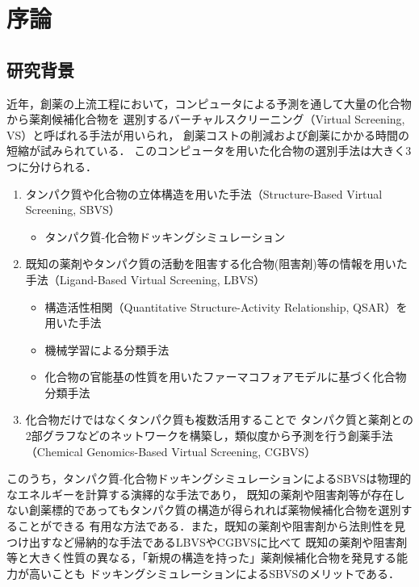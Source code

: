 \chapter{序論}
\section{研究背景}\label{sec:background}
近年，創薬の上流工程において，コンピュータによる予測を通して大量の化合物から薬剤候補化合物を
選別するバーチャルスクリーニング（Virtual Screening, VS）と呼ばれる手法が用いられ，
創薬コストの削減および創薬にかかる時間の短縮が試みられている．
このコンピュータを用いた化合物の選別手法は大きく3つに分けられる．

\begin{enumerate}
\item タンパク質や化合物の立体構造を用いた手法（Structure-Based Virtual Screening, SBVS）
	\begin{itemize}
	\item タンパク質-化合物ドッキングシミュレーション\cite{Friesner2004, Zsoldos2007, Morris2009}
	\end{itemize}
\item 既知の薬剤やタンパク質の活動を阻害する化合物(阻害剤)等の情報を用いた手法（Ligand-Based Virtual Screening, LBVS）
	\begin{itemize}
	\item 構造活性相関（Quantitative Structure-Activity Relationship, QSAR）を用いた手法\cite{Hansch1964}
	\item 機械学習による分類手法\cite{Ivanciuc2007}
	\item 化合物の官能基の性質を用いたファーマコフォアモデルに基づく化合物分類手法\cite{Wolber2008}
	\end{itemize}
\item 化合物だけではなくタンパク質も複数活用することで
	タンパク質と薬剤との2部グラフなどのネットワークを構築し，類似度から予測を行う創薬手法 
	（Chemical Genomics-Based Virtual Screening, CGBVS）\cite{Brown2012}
\end{enumerate}

このうち，タンパク質-化合物ドッキングシミュレーションによるSBVSは物理的なエネルギーを計算する演繹的な手法であり，
既知の薬剤や阻害剤等が存在しない創薬標的であってもタンパク質の構造が得られれば薬物候補化合物を選別することができる
有用な方法である．また，既知の薬剤や阻害剤から法則性を見つけ出すなど帰納的な手法であるLBVSやCGBVSに比べて
既知の薬剤や阻害剤等と大きく性質の異なる，「新規の構造を持った」薬剤候補化合物を発見する能力が高いことも
ドッキングシミュレーションによるSBVSのメリットである．

